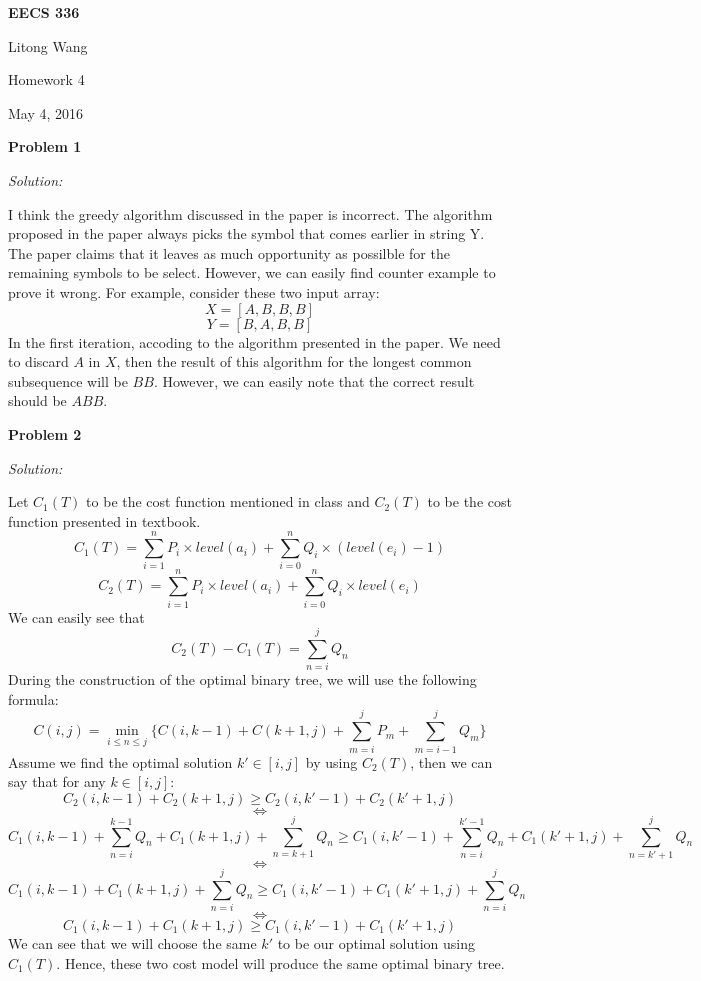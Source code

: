 \documentclass[12pt,letterpaper]{article}
\def\pp{\par\noindent}
\newcommand{\problem}[1]{ \bigskip \pp \textbf{Problem #1}\par}
\newcommand{\solution}{\textit{Solution:}\par}
\begin{document}
\centerline{\bf EECS 336}

\medskip
\centerline{Litong Wang}
\centerline{Homework 4}
\centerline{May 4, 2016}
\bigskip


\problem{1}
\solution
I think the greedy algorithm discussed in the paper is incorrect. The algorithm proposed in the paper always picks the symbol that comes earlier in string Y. \\
The paper claims that it leaves as much opportunity as possilble for the remaining symbols to be select. However, we can easily find counter example to prove it wrong. For example, consider these two input array: \\
$$X = [A,B,B,B]$$
$$Y = [B,A,B,B]$$
In the first iteration, accoding to the algorithm presented in the paper. We need to discard $A$ in $X$, then the result of this algorithm for the longest common subsequence will be $BB$. However, we can easily note that the correct result should be $ABB$.

\problem{2}
\solution
Let $C_1(T)$ to be the cost function mentioned in class and $C_2(T)$ to be the cost function presented in textbook. \\
$$C_1(T) = \sum_{i=1}^{n} P_i \times level(a_i) + \sum_{i=0}^{n} Q_i \times (level(e_i)-1) $$
$$C_2(T) = \sum_{i=1}^{n} P_i \times level(a_i) + \sum_{i=0}^{n} Q_i \times level(e_i) $$
We can easily see that \\ 
$$C_2(T) - C_1(T) = \sum_{ n = i }^{j} Q_n$$
During the construction of the optimal binary tree, we will use the following formula: \\
$$C(i,j) = \min_{i \le n \le j} \lbrace C(i,k-1) + C(k+1,j) + \sum_{m = i}^{j} P_m + \sum_{m = i - 1}^{j} Q_m \rbrace$$
Assume we find the optimal solution $k' \in [i,j] $ by using $C_2(T)$, then we can say that for any $k \in [i,j]$: \\
$$C_2(i,k-1) + C_2(k+1,j) \ge C_2(i,k'-1) + C_2(k'+1,j)$$
$$\Leftrightarrow$$
$$C_1(i,k-1) + \sum_{ n = i }^{k-1} Q_n + C_1(k+1,j) + \sum_{ n = k+1 }^{j} Q_n \ge C_1(i,k'-1) + \sum_{ n = i }^{k'-1} Q_n + C_1(k'+1,j) + \sum_{ n = k'+1 }^{j} Q_n$$
$$\Leftrightarrow$$
$$C_1(i,k-1) +  C_1(k+1,j) + \sum_{ n = i }^{j} Q_n \ge C_1(i,k'-1) + C_1(k'+1,j) + \sum_{ n = i }^{j} Q_n$$
$$\Leftrightarrow$$
$$C_1(i,k-1) + C_1(k+1,j) \ge C_1(i,k'-1) + C_1(k'+1,j)$$
We can see that we will choose the same $k'$ to be our optimal solution using $C_1(T)$. Hence, these two cost model will produce the same optimal binary tree.
\end{document}
